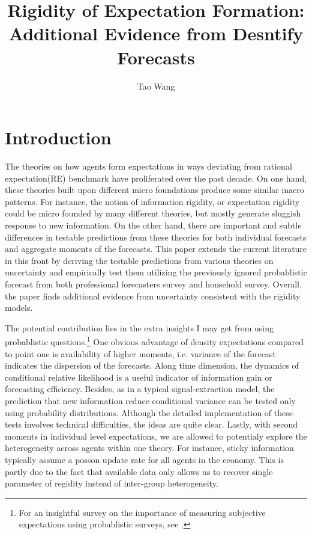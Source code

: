 \documentclass[]{article}
\title{Rigidity of Expectation Formation: Additional Evidence from Desntify Forecasts}
\author{Tao Wang}
\begin{document}
\maketitle

\section{Introduction}


The theories on how agents form expectations in ways deviating from rational expectation(RE) benchmark have proliferated over the past decade. On one hand, these theories built upon different micro foundations produce some similar macro patterns. For instance, the notion of information rigidity, or expectation rigidity could be micro founded by many different theories, but mostly generate sluggish response to new information.  On the other hand, there are important and subtle differences in testable predictions from these theories for both individual forecasts and aggregate moments of the forecasts. This paper extends the current literature in this front by deriving the testable predictions from various theories on uncertainty and empirically test them utilizing the previously ignored probablistic forecast from both professional forecasters survey and household survey. Overall, the paper finds additional evidence from uncertainty consistent with the rigidity models. 

The potential contribution lies in the extra insights I may get from using probablistic questions.\footnote{For an insightful survey on the importance of measuring subjective expectations using probablistic surveys, see \citet{manski2004measuring}.} One obvious advantage of density expectations compared to point one is availability of higher moments, i.e. variance of the forecast indicates the dispersion of the forecasts. Along time dimension, the dynamics of conditional relative likelihood is a useful indicator of information gain or forecasting efficiency. Besides, as in a typical signal-extraction model, the prediction that new information reduce conditional variance can be tested only using probability distributions. Although the detailed implementation of these tests involves technical difficulties, the ideas are quite clear.  Lastly, with second moments in individual level expectations, we are allowed to potentialy explore the heterogeneity across agents within one theory. For instance, sticky information typically assume a posson update rate for all agents in the economy. This is partly due to the fact that available data only allows us to recover single parameter of regidity instead of inter-group heterogeneity.  
\end{document}
